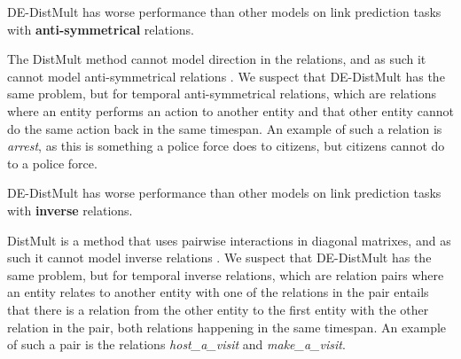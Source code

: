 \begin{subhypothesis}
\label{hyp:relation_property_antisym}
DE-DistMult has worse performance than other models on link prediction tasks with \textbf{anti-symmetrical} relations.
\end{subhypothesis}

The DistMult method cannot model direction in the relations, and as such it cannot model anti-symmetrical relations \cite{goel19diachronicemb}. We suspect that DE-DistMult has the same problem, but for temporal anti-symmetrical relations, which are relations where an entity performs an action to another entity and that other entity cannot do the same action back in the same timespan. An example of such a relation is \textit{arrest}, as this is something a police force does to citizens, but citizens cannot do to a police force.


\begin{subhypothesis}
\label{hyp:relation_property_inv}
DE-DistMult has worse performance than other models on link prediction tasks with \textbf{inverse} relations.
\end{subhypothesis}

DistMult is a method that uses pairwise interactions in diagonal matrixes, and as such it cannot model inverse relations \cite{goel19diachronicemb}. We suspect that DE-DistMult has the same problem, but for temporal inverse relations, which are relation pairs where an entity relates to another entity with one of the relations in the pair entails that there is a relation from the other entity to the first entity with the other relation in the pair, both relations happening in the same timespan. An example of such a pair is the relations \textit{host\_a\_visit} and \textit{make\_a\_visit}.



